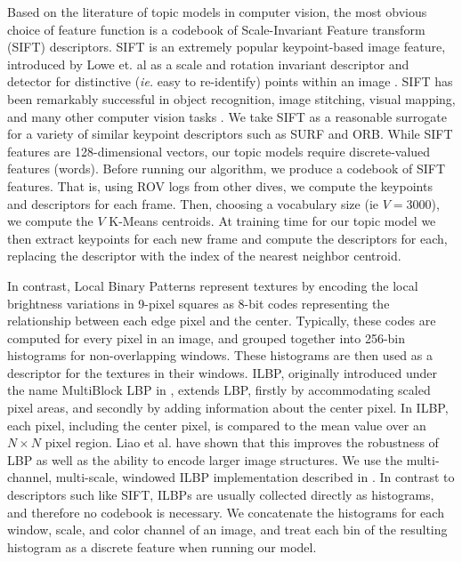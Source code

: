 Based on the literature of topic models in computer vision, the most obvious choice of feature function is a codebook of Scale-Invariant Feature transform (SIFT) descriptors. SIFT is an extremely popular keypoint-based image feature, introduced by Lowe et. al as a scale and rotation invariant descriptor and detector for distinctive (\emph{ie.} easy to re-identify) points within an image \citep{Lowe2004}. SIFT has been remarkably successful in object recognition, image stitching, visual mapping, and many other computer vision tasks . We take SIFT as a reasonable surrogate for a variety of similar keypoint descriptors such as SURF and ORB. While SIFT features are 128-dimensional vectors, our topic models require discrete-valued features (words). Before running our algorithm, we produce a codebook of SIFT features. That is, using ROV logs from other dives, we compute the keypoints and descriptors for each frame. Then, choosing a vocabulary size (ie $V = 3000$), we compute the $V$ K-Means centroids. At training time for our topic model we then extract keypoints for each new frame and compute the descriptors for each, replacing the descriptor with the index of the nearest neighbor centroid.

In contrast, Local Binary Patterns represent textures by encoding the local brightness variations in 9-pixel squares as 8-bit codes representing the relationship between each edge pixel and the center. Typically, these codes are computed for every pixel in an image, and grouped together into 256-bin histograms for non-overlapping windows. These histograms are then used as a descriptor for the textures in their windows. ILBP, originally introduced under the name MultiBlock LBP in \citep{Liao2007}, extends LBP, firstly by accommodating scaled pixel areas, and secondly by adding information about the center pixel. In ILBP, each pixel, including the center pixel, is compared to the mean value over an $N \times N$ pixel region. Liao et al. have shown that this improves the robustness of LBP as well as the ability to encode larger image structures. We use the multi-channel, multi-scale, windowed ILBP implementation described in \citep{Paris2012}. In contrast to descriptors such like SIFT, ILBPs are usually collected directly as histograms, and therefore no codebook is necessary. We concatenate the histograms for each window, scale, and color channel of an image, and treat each bin of the resulting histogram as a discrete feature when running our model.

